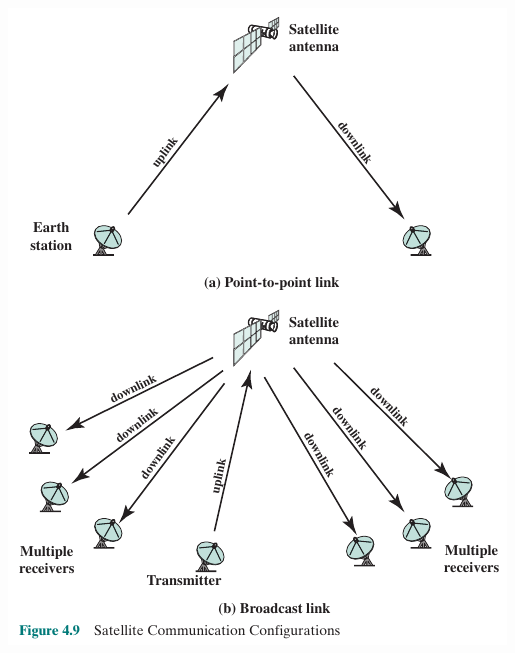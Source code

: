 \documentclass[pdflatex,compress]{beamer}
\begin{document}
\begin{frame}
	\begin{center}
		\includegraphics[height=0.9\textheight]{img/img20}
	\end{center}
\end{frame}
\end{document}
